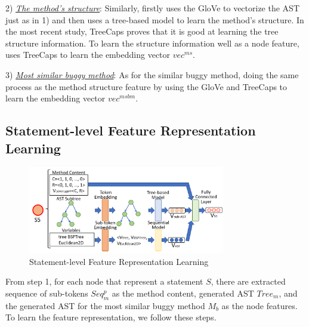 2) {\em \underline{The method's structure}}: Similarly, \tool firstly uses the GloVe to vectorize the AST just as in 1) and then uses a tree-based model to learn the method's structure. In the most recent study, TreeCaps \cite{bui2021treecaps} proves that it is good at learning the tree structure information. To learn the structure information well as a node feature, \tool uses TreeCaps to learn the embedding vector $vec^{ms}$.

3) {\em \underline{Most similar buggy method}}: As for the similar buggy method, \tool doing the same process as the method structure feature by using the GloVe and TreeCaps to learn the embedding vector $vec^{msbm}$.

\subsection{Statement-level Feature Representation Learning}

\begin{figure}[t]
	\centering
	\includegraphics[width=3.4in]{graphs/step-2-statement-new.png}
	\caption{Statement-level Feature Representation Learning}
	\label{statement-level-feature-learning}
\end{figure}

From step 1, for each node that represent a statement $S$, there are extracted sequence of sub-tokens $Seq^p_m$ as the method content, generated AST $Tree_m$, and the generated AST for the most similar buggy method $M_b$ as the node features. To learn the feature representation, we follow these steps.



